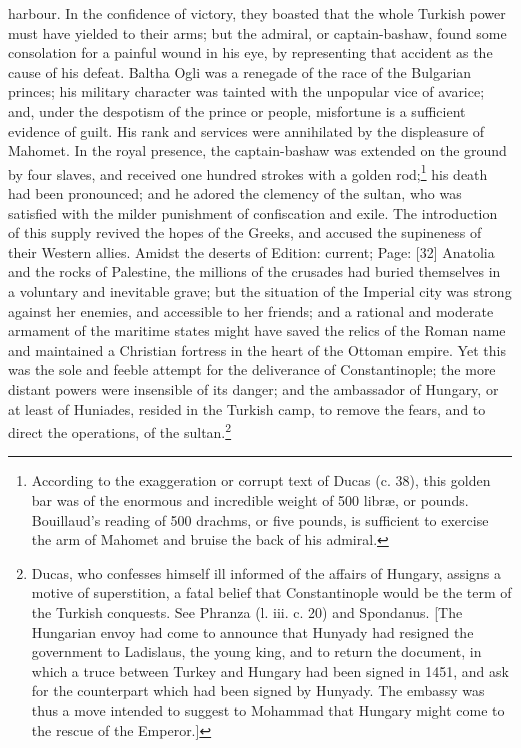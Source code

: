 harbour. In the confidence of victory, they boasted that the whole Turkish power must have yielded to their arms; but the admiral, or captain-bashaw, found some consolation for a painful wound in his eye, by representing that accident as the cause of his defeat. Baltha Ogli was a renegade of the race of the Bulgarian princes; his military character was tainted with the unpopular vice of avarice; and, under the despotism of the prince or people, misfortune is a sufficient evidence of guilt. His rank and services were annihilated by the displeasure of Mahomet. In the royal presence, the captain-bashaw was extended on the ground by four slaves, and received one hundred strokes with a golden rod;\footnote{According to the exaggeration or corrupt text of Ducas (c. 38), this golden bar was of the enormous and incredible weight of 500 libræ, or pounds. Bouillaud\texthebrew{}’s reading of 500 drachms, or five pounds, is sufficient to exercise the arm of Mahomet and bruise the back of his admiral.} his death had been pronounced; and he adored the clemency of the sultan, who was satisfied with the milder punishment of confiscation and exile. The introduction of this supply revived the hopes of the Greeks, and accused the supineness of their Western allies. Amidst the deserts of Edition: current; Page: [32] Anatolia and the rocks of Palestine, the millions of the crusades had buried themselves in a voluntary and inevitable grave; but the situation of the Imperial city was strong against her enemies, and accessible to her friends; and a rational and moderate armament of the maritime states might have saved the relics of the Roman name and maintained a Christian fortress in the heart of the Ottoman empire. Yet this was the sole and feeble attempt for the deliverance of Constantinople; the more distant powers were insensible of its danger; and the ambassador of Hungary, or at least of Huniades, resided in the Turkish camp, to remove the fears, and to direct the operations, of the sultan.\footnote{Ducas, who confesses himself ill informed of the affairs of Hungary, assigns a motive of superstition, a fatal belief that Constantinople would be the term of the Turkish conquests. See Phranza (l. iii. c. 20) and Spondanus. [The Hungarian envoy had come to announce that Hunyady had resigned the government to Ladislaus, the young king, and to return the document, in which a truce between Turkey and Hungary had been signed in 1451, and ask for the counterpart which had been signed by Hunyady. The embassy was thus a move intended to suggest to Mohammad that Hungary might come to the rescue of the Emperor.]}

